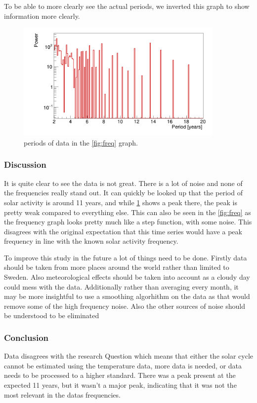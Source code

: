 To be able to more clearly see the actual periods, we inverted this graph to show information more clearly.

\begin{figure}[H]
    \centering
    \includegraphics[width=0.9\textwidth]{../plots/solar/period_analysis.png}
    \caption{periods of data in the \ref{fig:freq} graph.}
    \label{fig:period}
\end{figure}

\subsubsection{Discussion}

It is quite clear to see the data is not great. There is a lot of noise and none of the frequencies really stand out. It can quickly be looked up that the period of solar activity is around 11 years, and while \ref{fig:period} shows a peak there, the peak is pretty weak compared to everything else. This can also be seen in the \ref{fig:freq} as the frequency graph looks pretty much like a step function, with some noise. This disagrees with the original expectation that this time series would have a peak frequency in line with the known solar activity frequency.

To improve this study in the future a lot of things need to be done. Firstly data should be taken from more places around the world rather than limited to Sweden. Also meteorological effects should be taken into account as a cloudy day could mess with the data. Additionally rather than averaging every month, it may be more insightful to use a smoothing algorhithm on the data as that would remove some of the high frequency noise. Also the other sources of noise should be understood to be eliminated

\subsubsection{Conclusion}

Data disagrees with the research Question which means that either the solar cycle cannot be estimated using the temperature data, more data is needed, or data needs to be processed to a higher standard. There was a peak present at the expected 11 years, but it wasn't a major peak, indicating that it was not the most relevant in the datas frequencies.